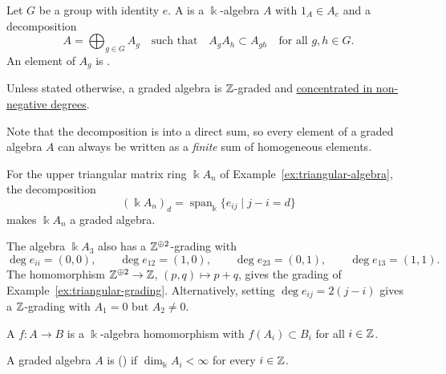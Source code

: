 \begin{definition}\label{def:group-grading}
Let $G$ be a group with identity $e$.
A  is a $\Bbbk$-algebra $A$ with $1_A\in A_e$ and a decomposition
\[
A=\bigoplus_{g\in G}A_g
\quad\text{such that}\quad
A_gA_h\subset A_{gh}
\quad\text{for all }g,h\in G.
\]
An element of $A_g$ is .
\end{definition}

\begin{convention}
Unless stated otherwise, a graded algebra is $\mathbb{Z}$-graded and \uline{concentrated in non-negative degrees}.
\end{convention}

Note that the decomposition is into a direct sum, so every element of a graded algebra $A$ can always be written as a \emph{finite} sum of homogeneous elements.

\begin{example}\label{ex:triangular-grading}
For the upper triangular matrix ring $\Bbbk A_n$ of Example~\ref{ex:triangular-algebra}, the decomposition
\[
(\Bbbk A_n)_d=\operatorname{span}_\Bbbk\{e_{ij}\mid j-i=d\}
\]
makes $\Bbbk A_n$ a graded algebra.
\end{example}

\begin{supplementary}
\begin{example}
The algebra $\Bbbk A_3$ also has a $\mathbb{Z}^{\oplus 2}$-grading with
\[
\deg e_{ii}=(0,0),\qquad
\deg e_{12}=(1,0),\qquad
\deg e_{23}=(0,1),\qquad
\deg e_{13}=(1,1).
\]
The homomorphism $\mathbb{Z}^{\oplus 2}\to\mathbb{Z}$, $(p,q)\mapsto p+q$, gives the grading of Example~\ref{ex:triangular-grading}.
Alternatively, setting $\deg e_{ij}=2(j-i)$ gives a $\mathbb{Z}$-grading with $A_1=0$ but $A_2\neq 0$.
\end{example}
\end{supplementary}


\begin{definition}
A  $f:A\to B$ is a $\Bbbk$-algebra homomorphism with $f(A_i)\subset B_i$ for all $i\in\mathbb{Z}$.
\end{definition}

\begin{definition}\label{def:lfd-algebra}
A graded algebra $A$ is  () if $\dim_\Bbbk A_i<\infty$ for every $i\in\mathbb{Z}$.
\end{definition}
%

